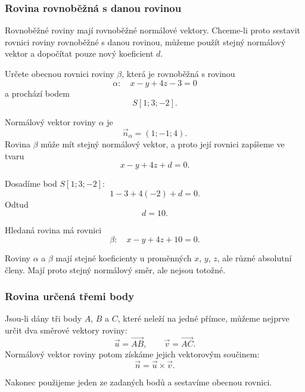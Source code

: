 \subsubsection{Rovina rovnoběžná s danou rovinou}
\label{subsubsec:Parallel_plane_through_point}

Rovnoběžné roviny mají rovnoběžné normálové vektory. Chceme-li proto
sestavit rovnici roviny rovnoběžné s danou rovinou, můžeme použít stejný
normálový vektor a dopočítat pouze nový koeficient $d$.

\begin{example}
    \label{exa:Parallel_plane_through_point}
    Určete obecnou rovnici roviny $\beta$, která je rovnoběžná s rovinou
    \[
        \alpha:\quad x-y+4z-3=0
    \]
    a prochází bodem
    \[
        S[1;3;-2].
    \]

    Normálový vektor roviny $\alpha$ je
    \[
        \vec{n}_{\alpha}=(1;-1;4).
    \]
    Rovina $\beta$ může mít stejný normálový vektor, a proto její rovnici
    zapíšeme ve tvaru
    \[
        x-y+4z+d=0.
    \]

    Dosadíme bod $S[1;3;-2]$:
    \[
        1-3+4(-2)+d=0.
    \]
    Odtud
    \[
        d=10.
    \]

    Hledaná rovina má rovnici
    \[
        \beta:\quad x-y+4z+10=0.
    \]
\end{example}

Roviny $\alpha$ a $\beta$ mají stejné koeficienty u proměnných $x$, $y$,
$z$, ale různé absolutní členy. Mají proto stejný normálový směr, ale
nejsou totožné.

\subsubsection{Rovina určená třemi body}
\label{subsubsec:General_plane_three_points}

Jsou-li dány tři body $A$, $B$ a $C$, které neleží na jedné přímce,
můžeme nejprve určit dva směrové vektory roviny:
\[
    \vec{u}=\overrightarrow{AB},
    \qquad
    \vec{v}=\overrightarrow{AC}.
\]
Normálový vektor roviny potom získáme jejich vektorovým součinem:
\[
    \vec{n}=\vec{u}\times\vec{v}.
\]

Nakonec použijeme jeden ze zadaných bodů a sestavíme obecnou rovnici.

